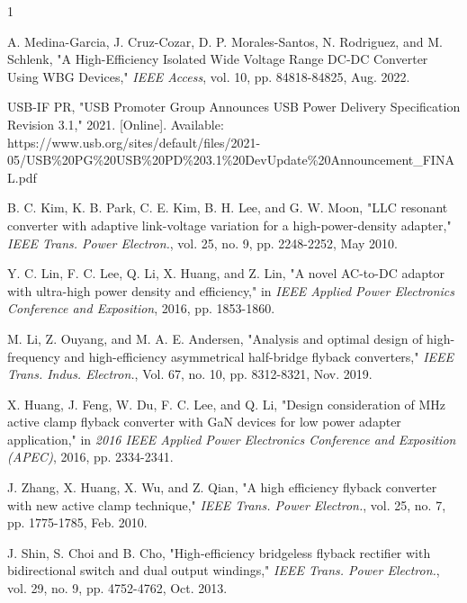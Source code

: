\documentclass[lettersize,journal]{IEEEtran}
\begin{document}






\begin{thebibliography}{1}


A. Medina-Garcia, J. Cruz-Cozar, D. P. Morales-Santos, N. Rodriguez, and M. Schlenk, "A High-Efficiency Isolated Wide Voltage Range DC-DC Converter Using WBG Devices," \textit{IEEE Access}, vol. 10, pp. 84818-84825, Aug. 2022.

USB-IF PR, "USB Promoter Group Announces USB Power Delivery Specification Revision 3.1," 2021. [Online]. Available: https://www.usb.org/sites/default/files/2021-05/USB\%20PG\%20USB\%20PD\%203.1\%20DevUpdate\%20Announcement\_FINAL.pdf

B. C. Kim, K. B. Park, C. E. Kim, B. H. Lee, and G. W. Moon, "LLC resonant converter with adaptive link-voltage variation for a high-power-density adapter," \textit{IEEE Trans. Power Electron.}, vol. 25, no. 9, pp. 2248-2252, May 2010.

Y. C. Lin, F. C. Lee, Q. Li, X. Huang, and Z. Lin, "A novel AC-to-DC adaptor with ultra-high power density and efficiency," in \textit{IEEE Applied Power Electronics Conference and Exposition}, 2016, pp. 1853-1860.

M. Li, Z. Ouyang, and M. A. E. Andersen, "Analysis and optimal design of high-frequency and high-efficiency asymmetrical half-bridge flyback converters," \textit{IEEE Trans. Indus. Electron.}, Vol. 67, no. 10, pp. 8312-8321, Nov. 2019.

X. Huang, J. Feng, W. Du, F. C. Lee, and Q. Li, "Design consideration of MHz active clamp flyback converter with GaN devices for low power adapter application," in \textit{2016 IEEE Applied Power Electronics Conference and Exposition (APEC)}, 2016, pp. 2334-2341.

J. Zhang, X. Huang, X. Wu, and Z. Qian, "A high efficiency flyback converter with new active clamp technique," \textit{IEEE Trans. Power Electron.}, vol. 25, no. 7, pp. 1775-1785, Feb. 2010.

J. Shin, S. Choi and B. Cho, "High-efficiency bridgeless flyback rectifier with bidirectional switch and dual output windings," \textit{IEEE Trans. Power Electron.}, vol. 29, no. 9, pp. 4752-4762, Oct. 2013.


\end{thebibliography}
\end{document}
